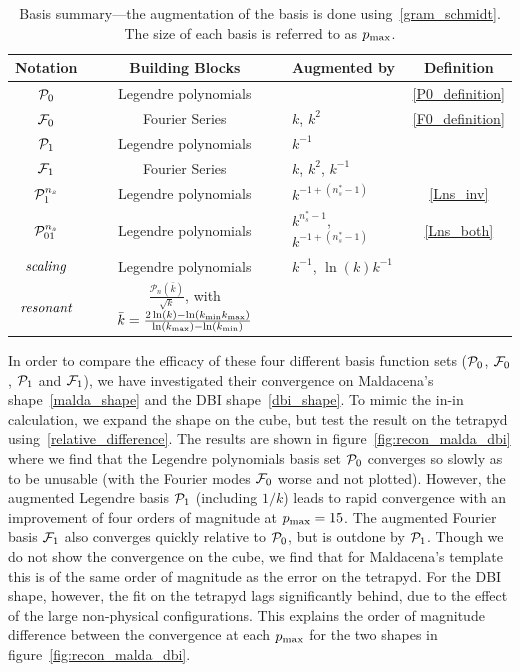 \begin{table}[h!]
  \begin{center}
    \begin{tabular}{c|c|l|c}
      \textbf{Notation} & \textbf{Building Blocks} & \textbf{Augmented by} & \textbf{Definition}\\
      \hline
        $\mathcal{P}_0$  & Legendre polynomials &                & \eqref{P0_definition}\\
        $\mathcal{F}_0$  & Fourier Series & $k$, $k^2$           & \eqref{F0_definition}\\
        $\mathcal{P}_1$   & Legendre polynomials & $k^{-1}$       & \\
        $\mathcal{F}_1$   & Fourier Series & $k$, $k^2$, $k^{-1}$ & \\
        $\mathcal{P}^{n_s}_1$  & Legendre polynomials & $k^{-1+(n_s^{*}-1)}$   & \eqref{Lns_inv}\\
        $\mathcal{P}^{n_s}_{01}$ & Legendre polynomials& $k^{n_s^{*}-1}$, $k^{-1+(n_s^{*}-1)}$ & \eqref{Lns_both}\\
        $\textit{scaling}$ & Legendre polynomials& $k^{-1}$, $\ln(k)k^{-1}$ &\\
        $\textit{resonant}$ & $\frac{\mathcal{P}_n(\bar{k})}{\sqrt{k}}$, with $\bar{k}=\frac{2\ln(k)-\ln({k_\text{min}}{k_\text{max}})}{\ln({k_\text{max}})-\ln({k_\text{min}})}$& &\\
    \end{tabular}
    \caption{
          Basis summary---the augmentation of the basis is done
          using~\eqref{gram_schmidt}. The size of each basis is
          referred to as $p_\text{max}$.
      }\label{tab:basis_summary}
  \end{center}
\end{table}

In order to compare the efficacy of these four different basis function sets ($\mathcal{P}_0$, $\mathcal{F}_0$, $\mathcal{P}_1$ and $\mathcal{F}_1$), we have investigated their convergence on Maldacena's shape~\eqref{malda_shape} and the DBI shape~\eqref{dbi_shape}.  To mimic the in-in calculation, we expand the shape on the cube, but test the result on the tetrapyd
using~\eqref{relative_difference}.
The results are shown in figure~\ref{fig:recon_malda_dbi} where we find that the Legendre polynomials basis set $\mathcal{P}_0$ converges so slowly as to be unusable (with the Fourier modes $\mathcal{F}_0$ worse and not plotted).
However, the augmented Legendre basis $\mathcal{P}_1$ (including $1/k$) leads to rapid convergence with an improvement of four orders
of magnitude at $p_\text{max}=15$. The augmented Fourier basis $\mathcal{F}_1$ also converges
quickly relative to $\mathcal{P}_0$, but is outdone by $\mathcal{P}_1$.
Though we do not show the convergence on the cube, we find that for Maldacena's
template this is of the same order of magnitude as
the error on the tetrapyd.  For the DBI shape, however, the
fit on the tetrapyd lags significantly behind, due to the effect
of the large non-physical configurations. This explains the order of
magnitude difference between the convergence at
each $p_\text{max}$ for the two shapes in figure~\ref{fig:recon_malda_dbi}.



